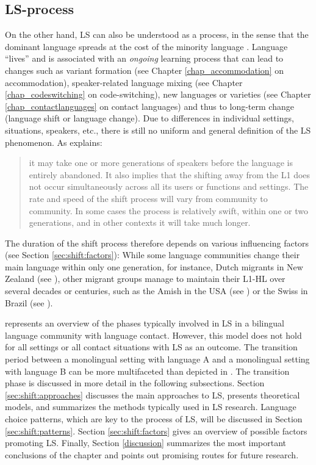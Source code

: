 \documentclass[output=paper]{langscibook}
\begin{document}
\subsection{LS-process}\label{sec:karnopp:1.1}

On the other hand, LS can also be understood as a process, in the sense that the dominant language spreads at the cost of the minority language \parencite[31]{Bohm2010}. Language ``lives'' and is associated with an \emph{ongoing} learning process that can lead to changes such as variant formation (see Chapter \ref{chap_accommodation} on accommodation),
speaker-related language mixing (see Chapter \ref{chap_codeswitching} on code-switching),
new languages or varieties (see Chapter \ref{chap_contactlanguages} on contact languages) and thus to long-term change (language shift or language change). Due to differences in individual settings, situations, speakers, etc., there is still no uniform and general definition of the LS phenomenon. As \textcite[19]{Pauwels2016} explains:

\begin{quote}
it may take one or more generations of speakers before the language is entirely abandoned. It also implies that the shifting away from the L1 does not occur simultaneously across all its users or functions and settings. The rate and speed of the shift process will vary from community to community. In some cases the process is relatively swift, within one or two generations, and in other contexts it will take much longer.
\end{quote}

\noindent The duration of the shift process therefore depends on various influencing factors (see Section \ref{sec:shift:factors}): While some language communities change their main language within only one generation, for instance, Dutch migrants in New Zealand (see \citealt{VanRijk2017}), other migrant groups manage to maintain their L1-HL over several decades or centuries, such as the Amish in the USA (see \citealt{Sağlamel2013}) or the Swiss in Brazil (see \citealt{Karnopp}).

 represents an overview of the phases typically involved in LS in a bilingual language community with language contact. However, this model does not hold for all settings or all contact situations with LS as an outcome. The transition period between a monolingual setting with language A and a monolingual setting with language B can be more multifaceted than depicted in . The transition phase is discussed in more detail in the following subsections. Section \ref{sec:shift:approaches} discusses the main approaches to LS, presents theoretical models, and summarizes the methods typically used in LS research. Language choice patterns, which are key to the process of LS, will be discussed in Section \ref{sec:shift:patterns}. Section \ref{sec:shift:factors} gives an overview of possible factors promoting LS. Finally, Section \ref{discussion} summarizes the most important conclusions of the chapter and points out promising routes for future research.
\end{document}
